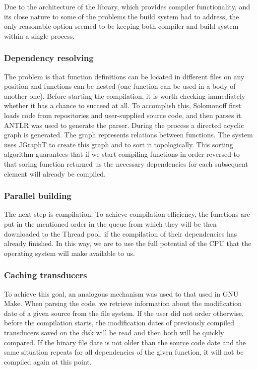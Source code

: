 Due to the architecture of the library, which provides compiler
functionality, and its close nature to some of the problems the build
system had to address, the only reasonable option seemed to be keeping
both compiler and build system within a single process.

\hypertarget{dependency-resolving}{%
\subsubsection{Dependency resolving}\label{dependency-resolving}}

The problem is that function definitions can be located in different
files on any position and functions can be nested (one function can be
used in a body of another one). Before starting the compilation, it is
worth checking immediately whether it has a chance to succeed at all. To
accomplish this, Solomonoff first loads code from repositories and
user-supplied source code, and then parses it. ANTLR was used to
generate the parser. During the process a directed acyclic graph is
generated. The graph represents relations between functions. The system
uses JGraphT to create this graph and to sort it topologically. This
sorting algorithm guarantees that if we start compiling functions in
order reversed to that soring function returned us the necessary
dependencies for each subsequent element will already be compiled.

\hypertarget{parallel-building}{%
\subsubsection{Parallel building}\label{parallel-building}}

The next step is compilation. To achieve compilation efficiency, the
functions are put in the mentioned order in the queue from which they
will be then downloaded to the Thread pool, if the compilation of their
dependencies has already finished. In this way, we are to use the full
potential of the CPU that the operating system will make available to
us.

\hypertarget{caching-transducers}{%
\subsubsection{Caching transducers}\label{caching-transducers}}

To achieve this goal, an analogous mechanism was used to that used in
GNU Make. When parsing the code, we retrieve information about the
modification date of a given source from the file system. If the user
did not order otherwise, before the compilation starts, the modification
dates of previously compiled transducers saved on the disk will be read
and then both will be quickly compared. If the binary file date is not
older than the source code date and the same situation repeats for all
dependencies of the given function, it will not be compiled again at
this point.

